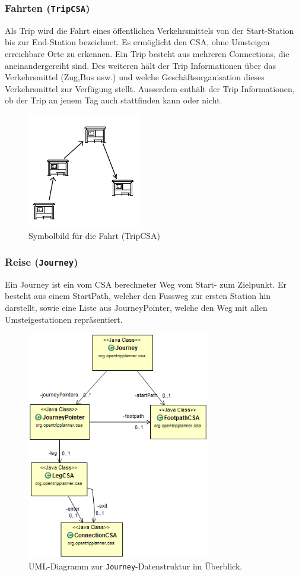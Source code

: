 \subsubsection{Fahrten (\texttt{TripCSA})}

Als Trip wird die \hypertarget{trip}{Fahrt} eines öffentlichen Verkehrsmittels von der Start-Station bis zur End-Station bezeichnet. Es ermöglicht den CSA, ohne Umsteigen erreichbare Orte zu erkennen. Ein Trip besteht aus mehreren Connections, die aneinandergereiht sind. Des weiteren hält der Trip Informationen über das Verkehrsmittel (Zug,Bus usw.) und welche Geschäftsorganisation dieses Verkehrsmittel zur Verfügung stellt. Ausserdem enthält der Trip Informationen, ob der Trip an jenem Tag auch stattfinden kann oder nicht.

\begin{figure}[htb]
	\centering
	\includegraphics[width=5cm]{img/trip.png}
	\caption{Symbolbild für die Fahrt (TripCSA)}
	\label{fig:trip}
\end{figure}

\subsubsection{Reise (\texttt{Journey})}
Ein \hypertarget{journey}{Journey} ist ein vom CSA berechneter Weg vom Start- zum Zielpunkt. Er besteht aus einem StartPath, welcher den Fussweg zur ersten Station hin darstellt, sowie eine Liste aus JourneyPointer, welche den Weg mit allen Umsteigestationen repräsentiert.
 
\begin{figure}[htb]
	\centering
	\includegraphics[width=8cm]{img/Journey.png}
	\caption{UML-Diagramm zur \texttt{Journey}-Datenstruktur im Überblick.}
	\label{fig:uml-journey}
\end{figure}

